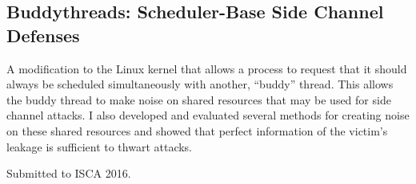 \documentclass[letterpaper,12pt]{resume}
\begin{document}
\subsection{Buddythreads: Scheduler-Base Side Channel Defenses}
A modification to the Linux kernel that allows a process to request that it
should always be scheduled simultaneously with another, ``buddy'' thread.
This allows the buddy thread to make noise on shared resources that may be used
for side channel attacks.
I also developed and evaluated several methods for creating noise on these
shared resources and showed that perfect information of the victim's leakage is
sufficient to thwart attacks.

Submitted to ISCA 2016.
\end{document}
